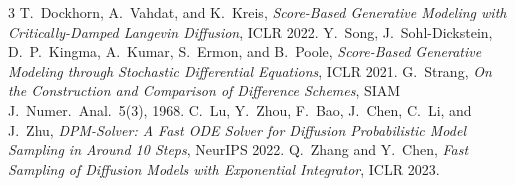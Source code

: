 \documentclass[11pt]{article}
\begin{document}
\begin{thebibliography}{3}
T.~Dockhorn, A.~Vahdat, and K.~Kreis,
\textit{Score-Based Generative Modeling with Critically-Damped Langevin Diffusion},
ICLR 2022.
Y.~Song, J.~Sohl-Dickstein, D.~P.~Kingma, A.~Kumar, S.~Ermon, and B.~Poole,
\textit{Score-Based Generative Modeling through Stochastic Differential Equations},
ICLR 2021.
G.~Strang,
\textit{On the Construction and Comparison of Difference Schemes},
SIAM J.\ Numer.\ Anal.\ 5(3), 1968.
C.~Lu, Y.~Zhou, F.~Bao, J.~Chen, C.~Li, and J.~Zhu,
\textit{DPM-Solver: A Fast ODE Solver for Diffusion Probabilistic Model Sampling in Around 10 Steps},
NeurIPS 2022.
Q.~Zhang and Y.~Chen,
\textit{Fast Sampling of Diffusion Models with Exponential Integrator},
ICLR 2023.
\end{thebibliography}
\end{document}

